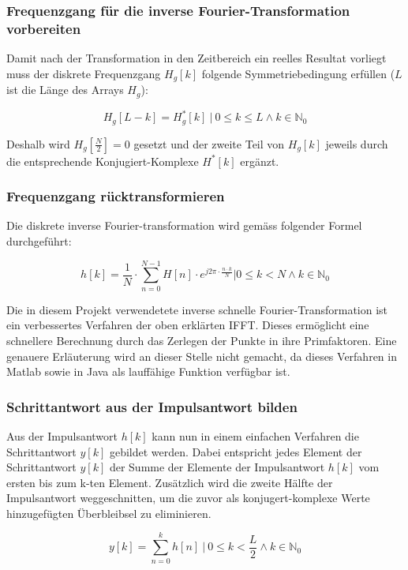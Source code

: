 \subsubsection*{Frequenzgang f\"ur die inverse Fourier-Transformation vorbereiten}
Damit nach der Transformation in den Zeitbereich ein reelles Resultat vorliegt
muss der diskrete Frequenzgang $H_g[k]$ folgende Symmetriebedingung erf\"ullen
($L$ ist die L\"ange des Arrays $H_g$):

\begin{equation}
    H_g[L-k]=H_g^*[k]  ~\biggr \rvert~ 0 \leq k \leq L \land k \in \mathbb{N}_0
\end{equation}

Deshalb wird $H_g[\frac{N}{2}]  = 0$ gesetzt und der zweite  Teil von $H_g[k]$
jeweils durch die entsprechende Konjugiert-Komplexe $H^*[k]$ erg\"anzt.

\subsubsection*{Frequenzgang r\"ucktransformieren}
Die  diskrete inverse  Fourier-transformation wird  gem\"ass folgender  Formel
durchgef\"uhrt:

\begin{equation}
    h[k]  = \frac{1}{N}  \cdot \displaystyle\sum_{n=0}^{N-1}  H[n] \cdot
    e^{j 2\pi \cdot \frac{n \cdot k}{N}} \biggr \rvert 0 \leq k < N \land k \in \mathbb{N}_0
\end{equation}

Die in diesem Projekt verwendetete inverse schnelle Fourier-Transformation ist
ein  verbessertes Verfahren  der oben  erkl\"arten IFFT.   Dieses erm\"oglicht
eine   schnellere  Berechnung   durch  das   Zerlegen  der   Punkte  in   ihre
Primfaktoren. Eine genauere Erl\"auterung wird an dieser Stelle nicht gemacht,
da  dieses  Verfahren  in  Matlab  sowie in  Java  als  lauff\"ahige  Funktion
verf\"ugbar ist.


\subsubsection*{Schrittantwort aus der Impulsantwort bilden}
Aus  der  Impulsantwort $h[k]$  kann  nun  in  einem einfachen  Verfahren  die
Schrittantwort  $y[k]$ gebildet  werden.  Dabei  entspricht jedes  Element der
Schrittantwort  $y[k]$ der  Summe der  Elemente der  Impulsantwort $h[k]$  vom
ersten  bis zum  k-ten Element.   Zus\"atzlich  wird die  zweite H\"alfte  der
Impulsantwort  weggeschnitten,  um  die  zuvor  als  konjugert-komplexe  Werte
hinzugef\"ugten \"Uberbleibsel zu eliminieren.

\begin{equation}
    y[k]= \sum_{n=0}^k h[n] ~\biggr \rvert~ 0 \leq k < \frac{L}{2} \land k \in \mathbb{N}_0
\end{equation}
